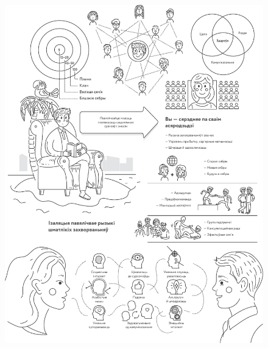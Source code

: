 \clearpage
\thispagestyle{empty}
\begin{figure}[htb!]
  \vspace*{-0in}
  \includegraphics[width=\textwidth]{willpower/ch10/full.pdf}  
\end{figure}
